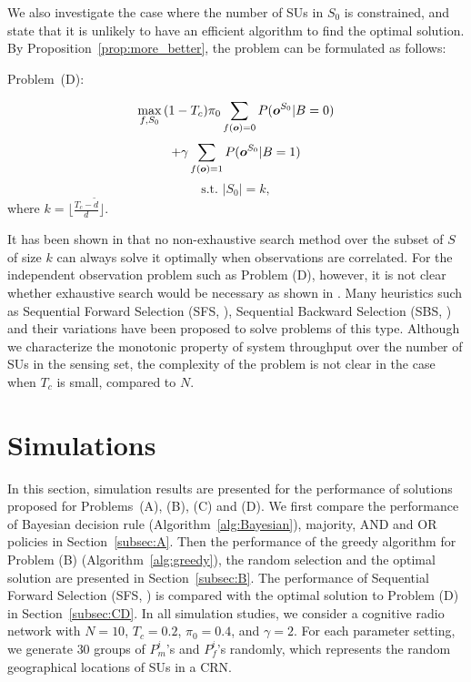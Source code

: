 \documentclass[conference]{IEEEtran}
\begin{document}
We also investigate the case where the number of SUs in $S_0$ is constrained, and state that it is unlikely to have an efficient algorithm to find the optimal solution. By Proposition~\ref{prop:more_better}, the problem can be formulated as follows:

Problem~(D):
\vspace{-0.8em}

\[\max\limits_{f,S_0}{(1-T_c){\pi}_0 \sum\limits_{f(\boldsymbol{o})=0}{P(\boldsymbol{o}^{S_0}|B=0)}}
\vspace{-0.5em}\]
\[+\gamma \sum\limits_{f(\boldsymbol{o})=1}{P(\boldsymbol{o}^{S_0}|B=1)}
\vspace{-0.5em}\]
\[\mbox{s.t. }|S_0|=k, 
\]
where $k=\lfloor \frac{T_c-\tilde{d}}{d} \rfloor$.

It has been shown in \cite{Pena} that no non-exhaustive search method over the subset of $S$ of size $k$ can always solve it optimally when observations are correlated. For the independent observation problem such as Problem (D), however, it is not clear whether exhaustive search would be necessary as shown in \cite{Van}. Many heuristics such as Sequential Forward Selection (SFS, \cite{SFS}), Sequential Backward Selection (SBS, \cite{SFS}) and their variations \cite{Kudo} have been proposed to solve problems of this type. Although we characterize the monotonic property of system throughput over the number of SUs in the sensing set, the complexity of the problem is not clear in the case when $T_c$ is small, compared to $N$.

\section{Simulations}
\label{sec:simu}
In this section, simulation results are presented for the performance of solutions proposed for Problems~(A), (B), (C) and (D). We first compare the performance of Bayesian decision rule (Algorithm~\ref{alg:Bayesian}), majority, AND and OR policies \cite{4533677} in Section~\ref{subsec:A}. Then the performance of the greedy algorithm for Problem (B) (Algorithm~\ref{alg:greedy}), the random selection and the optimal solution are presented in Section~\ref{subsec:B}. The performance of Sequential Forward Selection (SFS, \cite{SFS}) is compared with the optimal solution to Problem (D) in Section~\ref{subsec:CD}. In all simulation studies, we consider a cognitive radio network with $N=10$, $T_c=0.2$, ${\pi}_0=0.4$, and $\gamma=2$. For each parameter setting, we generate $30$ groups of $P_m^i$'s and $P_f^i$'s randomly, which represents the random geographical locations of SUs in a CRN.
\end{document}

